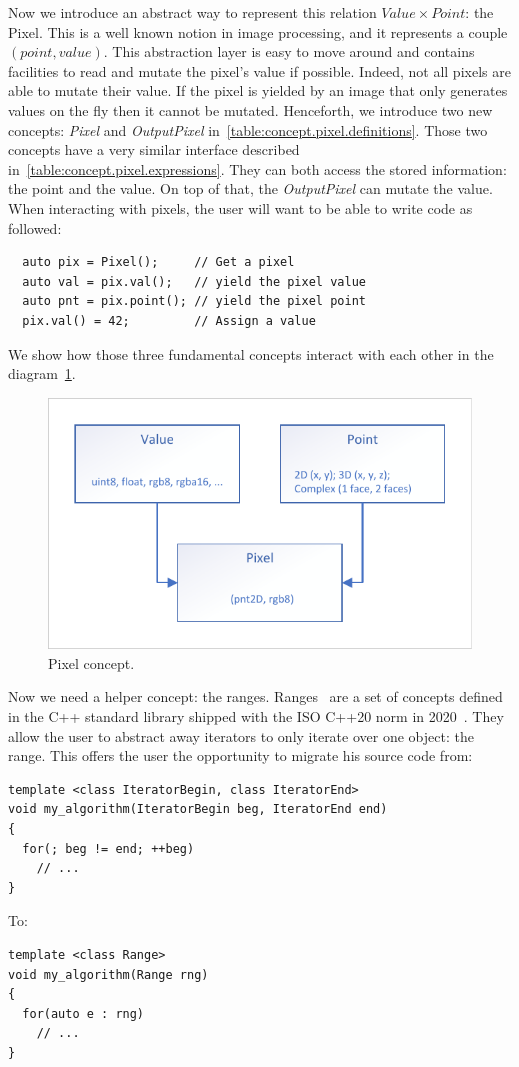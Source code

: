 Now we introduce an abstract way to represent this relation \(Value \times Point\): the Pixel. This is a well known
notion in image processing, and it represents a couple \((point, value)\). This abstraction layer is easy to move around
and contains facilities to read and mutate the pixel's value if possible. Indeed, not all pixels are able to mutate
their value. If the pixel is yielded by an image that only generates values on the fly then it cannot be mutated.
Henceforth, we introduce two new concepts: \emph{Pixel} and \emph{OutputPixel}
in~\cref{table:concept.pixel.definitions}. Those two concepts have a very similar interface described
in~\cref{table:concept.pixel.expressions}. They can both access the stored information: the point and the value. On top
of that, the \emph{OutputPixel} can mutate the value. When interacting with pixels, the user will want to be able to
write code as followed:
\begin{verbatim}
  auto pix = Pixel();     // Get a pixel
  auto val = pix.val();   // yield the pixel value
  auto pnt = pix.point(); // yield the pixel point
  pix.val() = 42;         // Assign a value
\end{verbatim}

We show how those three fundamental concepts interact with each other in the\\
diagram~\cref{fig:concept.pixel}.

\begin{figure}[htbp]
  \centering
  \includegraphics[width=.8\linewidth]{../figures/concepts/pixel}
  \caption{Pixel concept.}
  \label{fig:concept.pixel}
\end{figure}

Now we need a helper concept: the ranges.
Ranges~\parencite{niebler.2014.ranges,niebler.2018.ranges,niebler.2018.deepranges,niebler.2018.mergingranges} are a set
of concepts defined in the C++ standard library shipped with the ISO C++20 norm in 2020~\parencite{iso.2020.cpp}. They
allow the user to abstract away iterators to only iterate over one object: the range. This offers the user the
opportunity to migrate his source code from:
\begin{verbatim}
template <class IteratorBegin, class IteratorEnd>
void my_algorithm(IteratorBegin beg, IteratorEnd end)
{
  for(; beg != end; ++beg)
    // ...
}
\end{verbatim}
To:
\begin{verbatim}
template <class Range>
void my_algorithm(Range rng)
{
  for(auto e : rng)
    // ...
}
\end{verbatim}

